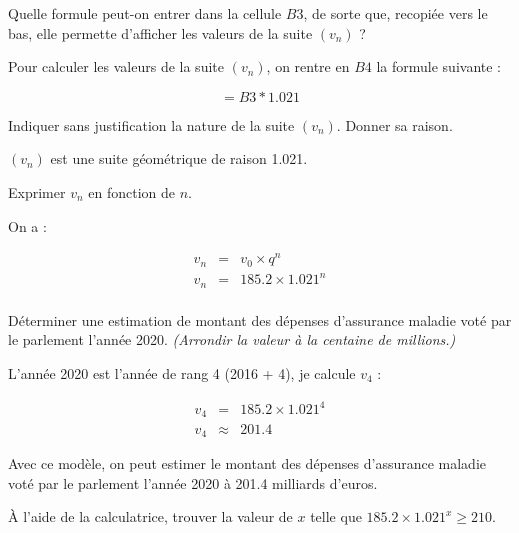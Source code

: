 \begin{questions}
	\setcounter{question}{1}
	\question Quelle formule peut-on entrer dans la cellule $B3$, de sorte que, recopiée vers le bas, elle permette d'afficher les valeurs de la suite $(v_n)$ ?
	
	\begin{solution}
		Pour calculer les valeurs de la suite $(v_n)$, on rentre en $B4$ la formule suivante : 
		
		\begin{equation*}
			= B3 * \num{1.021}
		\end{equation*}
	\end{solution}

	\question Indiquer sans justification la nature de la suite $(v_n)$. Donner sa raison.
	
	\begin{solution}
		$(v_n)$ est une suite géométrique de raison \num{1.021}.
	\end{solution}
	
	\question Exprimer $v_n$ en fonction de $n$.
	\begin{solution}
		On a : 
		
		\begin{eqnarray*}
			v_n &=& v_0 \times q^n \\
			v_n &=& \num{185.2} \times \num{1.021}^n \\
		\end{eqnarray*}
	\end{solution}
	
	\question Déterminer une estimation de montant des dépenses d'assurance maladie voté par le parlement l'année 2020. \emph{(Arrondir la valeur à la centaine de millions.)}
	\begin{solution}
		L'année 2020 est l'année de rang 4 (2016 + 4), je calcule $v_4$ :
		
		\begin{eqnarray*}
			v_4 &=& \num{185.2} \times \num{1.021}^4 \\
			v_4 & \approx & \num{201.4}
		\end{eqnarray*}
		
		Avec ce modèle, on peut estimer le montant des dépenses d'assurance maladie voté par le parlement l'année 2020 à \num{201.4} milliards d'euros.
	\end{solution}
	
	\question \`A l'aide de la calculatrice, trouver la valeur de $x$ telle que $\num{185.2} \times \num{1.021}^x \ge \num{210}$.
	

\end{questions}
